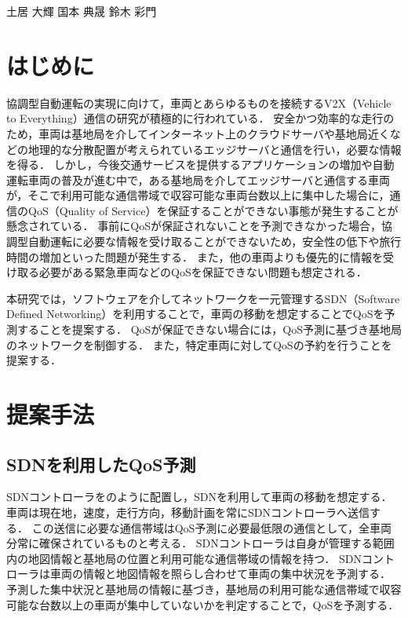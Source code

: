 \documentclass[a4paper,10pt,twocolumn,uplatex]{jsarticle}
\date{10}
\begin{document}
{土居 大輝}
{国本 典晟}
{鈴木 彩門}

\section{はじめに}
協調型自動運転の実現に向けて，車両とあらゆるものを接続するV2X（Vehicle to Everything）通信の研究が積極的に行われている．
安全かつ効率的な走行のため，車両は基地局を介してインターネット上のクラウドサーバや基地局近くなどの地理的な分散配置が考えられているエッジサーバ\cite{ETSI}と通信を行い，必要な情報を得る．
しかし，今後交通サービスを提供するアプリケーションの増加や自動運転車両の普及が進む中で，ある基地局を介してエッジサーバと通信する車両が，そこで利用可能な通信帯域で収容可能な車両台数以上に集中した場合に，通信のQoS（Quality of Service）を保証することができない事態が発生することが懸念されている\cite{SDNMEC}．
事前にQoSが保証されないことを予測できなかった場合，協調型自動運転に必要な情報を受け取ることができないため，安全性の低下や旅行時間の増加といった問題が発生する．
また，他の車両よりも優先的に情報を受け取る必要がある緊急車両などのQoSを保証できない問題も想定される．\par
本研究では，ソフトウェアを介してネットワークを一元管理するSDN（Software Defined Networking）を利用することで，車両の移動を想定することでQoSを予測することを提案する．
QoSが保証できない場合には，QoS予測に基づき基地局のネットワークを制御する．
また，特定車両に対してQoSの予約を行うことを提案する．

\section{提案手法}
\subsection{SDNを利用したQoS予測}
\label{QoSprediction}
SDNコントローラをのように配置し，SDNを利用して車両の移動を想定する．
車両は現在地，速度，走行方向，移動計画を常にSDNコントローラへ送信する．
この送信に必要な通信帯域はQoS予測に必要最低限の通信として，全車両分常に確保されているものと考える．
SDNコントローラは自身が管理する範囲内の地図情報と基地局の位置と利用可能な通信帯域の情報を持つ．
SDNコントローラは車両の情報と地図情報を照らし合わせて車両の集中状況を予測する．
予測した集中状況と基地局の情報に基づき，基地局の利用可能な通信帯域で収容可能な台数以上の車両が集中していないかを判定することで，QoSを予測する．
\end{document}
